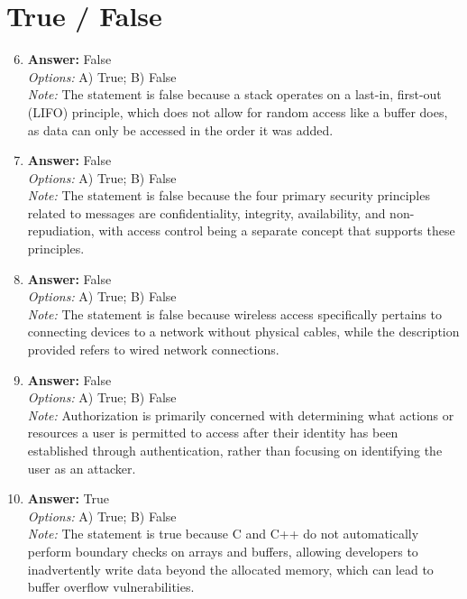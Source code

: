 \documentclass[12pt]{article}
\begin{document}
\section*{True / False}
\begin{enumerate}[label=\arabic*.]
\setcounter{enumi}{5}
\item \textbf{Answer:} False
\\ \textit{Options:} A) True; B) False
\\ \textit{Note:} The statement is false because a stack operates on a last-in, first-out (LIFO) principle, which does not allow for random access like a buffer does, as data can only be accessed in the order it was added.
\item \textbf{Answer:} False
\\ \textit{Options:} A) True; B) False
\\ \textit{Note:} The statement is false because the four primary security principles related to messages are confidentiality, integrity, availability, and non-repudiation, with access control being a separate concept that supports these principles.
\item \textbf{Answer:} False
\\ \textit{Options:} A) True; B) False
\\ \textit{Note:} The statement is false because wireless access specifically pertains to connecting devices to a network without physical cables, while the description provided refers to wired network connections.
\item \textbf{Answer:} False
\\ \textit{Options:} A) True; B) False
\\ \textit{Note:} Authorization is primarily concerned with determining what actions or resources a user is permitted to access after their identity has been established through authentication, rather than focusing on identifying the user as an attacker.
\item \textbf{Answer:} True
\\ \textit{Options:} A) True; B) False
\\ \textit{Note:} The statement is true because C and C++ do not automatically perform boundary checks on arrays and buffers, allowing developers to inadvertently write data beyond the allocated memory, which can lead to buffer overflow vulnerabilities.
\end{enumerate}
\end{document}
